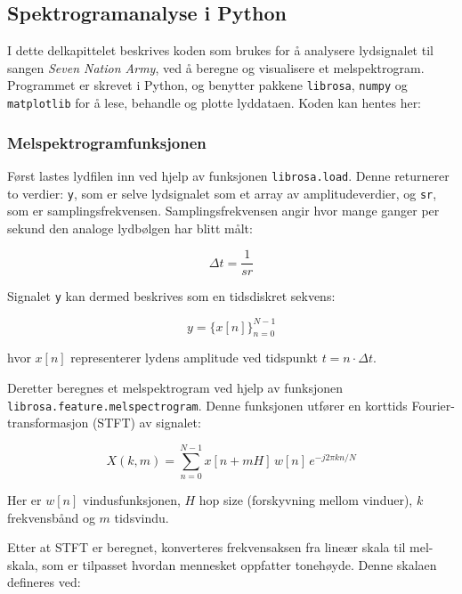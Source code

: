 \subsection{Spektrogramanalyse i Python}

I dette delkapittelet beskrives koden som brukes for å analysere lydsignalet til sangen 
\textit{Seven Nation Army}, ved å beregne og visualisere et melspektrogram. Programmet 
er skrevet i Python, og benytter pakkene \texttt{librosa}, \texttt{numpy} og \texttt{matplotlib} 
for å lese, behandle og plotte lyddataen. Koden kan hentes her: \parencite{python_mel_spektrogram}

\subsubsection{Melspektrogramfunksjonen}

Først lastes lydfilen inn ved hjelp av funksjonen \texttt{librosa.load}. Denne returnerer 
to verdier: \texttt{y}, som er selve lydsignalet som et array av amplitudeverdier, og 
\texttt{sr}, som er samplingsfrekvensen. Samplingsfrekvensen angir hvor mange ganger per sekund 
den analoge lydbølgen har blitt målt:

\begin{equation*}
    \Delta t = \frac{1}{sr}
\end{equation*}

Signalet \texttt{y} kan dermed beskrives som en tidsdiskret sekvens:

\begin{equation*}
    y = \{x[n]\}_{n=0}^{N-1}
\end{equation*}

hvor \( x[n] \) representerer lydens amplitude ved tidspunkt \( t = n \cdot \Delta t \).

Deretter beregnes et melspektrogram ved hjelp av funksjonen \texttt{librosa.feature.melspectrogram}. 
Denne funksjonen utfører en korttids Fourier-transformasjon (STFT) av signalet:

\begin{equation*}
    X(k,m) = \sum_{n=0}^{N-1} x[n+mH]\, w[n]\, e^{-j2\pi kn/N}
\end{equation*}

Her er \( w[n] \) vindusfunksjonen, \( H \) hop size (forskyvning mellom vinduer), 
\( k \) frekvensbånd og \( m \) tidsvindu.

Etter at STFT er beregnet, konverteres frekvensaksen fra lineær skala til mel-skala, 
som er tilpasset hvordan mennesket oppfatter tonehøyde. Denne skalaen defineres ved:

